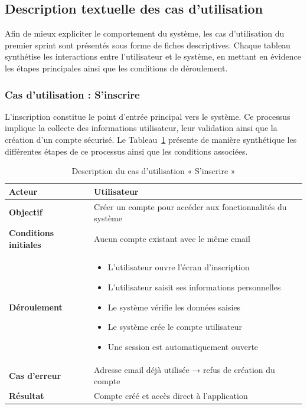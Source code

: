 \subsection{Description textuelle des cas d’utilisation}

Afin de mieux expliciter le comportement du système, les cas d’utilisation du premier sprint sont présentés sous forme de fiches descriptives. 
Chaque tableau synthétise les interactions entre l’utilisateur et le système, en mettant en évidence les étapes principales ainsi que les conditions de déroulement.

\subsubsection{Cas d’utilisation : S’inscrire}

L’inscription constitue le point d’entrée principal vers le système. Ce processus implique la collecte des informations utilisateur, leur validation ainsi que la création d’un compte sécurisé. Le Tableau~\ref{tab:uc_register} présente de manière synthétique les différentes étapes de ce processus ainsi que les conditions associées.

\begin{table}[H]
\centering
\renewcommand{\arraystretch}{1.2}
\begin{tabular}{|p{4cm}|p{10cm}|}
\hline
\textbf{Acteur} & Utilisateur \\ \hline

\textbf{Objectif} & Créer un compte pour accéder aux fonctionnalités du système \\ \hline

\textbf{Conditions initiales} & Aucun compte existant avec le même email \\ \hline

\textbf{Déroulement} &
\begin{itemize}
    \item L’utilisateur ouvre l’écran d’inscription
    \item L’utilisateur saisit ses informations personnelles
    \item Le système vérifie les données saisies
    \item Le système crée le compte utilisateur
    \item Une session est automatiquement ouverte
\end{itemize} \\ \hline

\textbf{Cas d’erreur} & Adresse email déjà utilisée → refus de création du compte \\ \hline

\textbf{Résultat} & Compte créé et accès direct à l’application \\ \hline
\end{tabular}
\caption{Description du cas d’utilisation « S’inscrire »}
\label{tab:uc_register}
\end{table}

